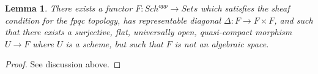 \documentclass[10pt,a4paper]{amsart}
\theoremstyle{plain}
\newtheorem{lemma}[subsection]{Lemma}
\theoremstyle{definition}
\theoremstyle{remark}
\numberwithin{equation}{subsection}
\def\Sch{\mathit{Sch}}
\begin{document}
\begin{lemma}
\label{lemma-not-algebraic}
There exists a functor $F : \Sch^{opp} \to \textit{Sets}$
which satisfies the sheaf condition for the fpqc topology, has representable
diagonal $\Delta : F \to F \times F$, and such that there exists a
surjective, flat, universally open, quasi-compact morphism
$U \to F$ where $U$ is a scheme, but such that $F$ is not an algebraic space.
\end{lemma}

\begin{proof}
See discussion above.
\end{proof}
\end{document}
